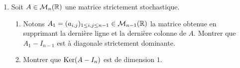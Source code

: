 \begin{enumerate}
 

 
 \item Soit $A\in \mathcal{M}_{n}(\mathbb{R})$ une matrice strictement stochastique. 
 \begin{enumerate}
  \item Notons $A_{1} = (a_{i,j})_{1\leq i,j\leq n-1}\in \mathcal{M}_{n-1}(\mathbb{R})$ la matrice obtenue en supprimant la dernière ligne et la dernière colonne de $A$. Montrer que $A_{1}-I_{n-1}$ est à diagonale strictement
  dominante. 
  \item Montrer que $\operatorname{Ker}(A-I_{n})$ est de dimension $1$. 
 \end{enumerate}
 
 

 


\end{enumerate}



